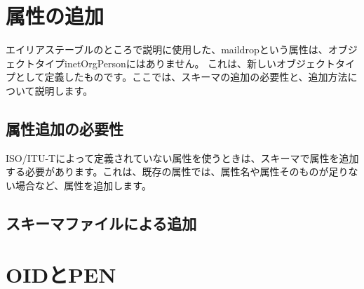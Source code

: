 \section{属性の追加}

エイリアステーブルのところで説明に使用した、maildropという属性は、オブジェクトタイプinetOrgPersonにはありません。
これは、新しいオブジェクトタイプとして定義したものです。ここでは、スキーマの追加の必要性と、追加方法について説明します。

\subsection{属性追加の必要性}

ISO/ITU-Tによって定義されていない属性を使うときは、スキーマで属性を追加する必要があります。これは、既存の属性では、属性名や属性そのものが足りない場合など、属性を追加します。




\subsection{スキーマファイルによる追加}

\section{OIDとPEN}